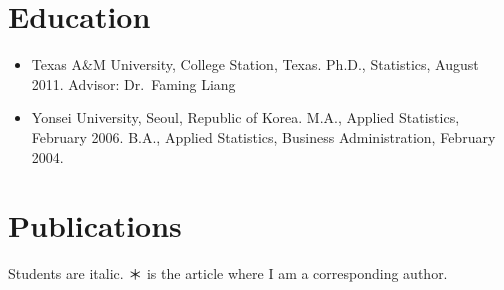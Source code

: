\documentclass[
]{book}
\begin{document}
\hypertarget{education}{%
\chapter*{Education}\label{education}}

\begin{itemize}
\item
  Texas A\&M University, College Station, Texas.
  Ph.D., Statistics, August 2011.
  Advisor: Dr.~Faming Liang
\item
  Yonsei University, Seoul, Republic of Korea.
  M.A., Applied Statistics, February 2006.
  B.A., Applied Statistics, Business Administration, February 2004.
\end{itemize}

\hypertarget{publications}{%
\chapter*{Publications}\label{publications}}

Students are italic.
＊ is the article where I am a corresponding author.
\end{document}
